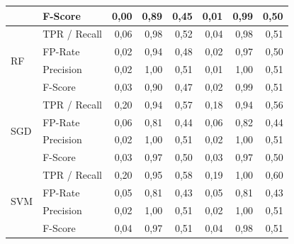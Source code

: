 \begin{table}
{\begin{tabular}{|ll|rrr|rrr|}
                     & F-Score      & 0,00             & 0,89                 & 0,45                     & 0,01             & 0,99                 & 0,50                      \\ 
\hline
\multirow{4}{*}{RF}  & TPR / Recall & 0,06             & 0,98                 & 0,52                     & 0,04             & 0,98                 & 0,51                      \\
                     & FP-Rate      & 0,02             & 0,94                 & 0,48                     & 0,02             & 0,97                 & 0,50                      \\
                     & Precision    & 0,02             & 1,00                 & 0,51                     & 0,01             & 1,00                 & 0,51                      \\
                     & F-Score      & 0,03             & 0,90                 & 0,47                     & 0,02             & 0,99                 & 0,51                      \\ 
\hline
\multirow{4}{*}{SGD} & TPR / Recall & 0,20             & 0,94                 & 0,57                     & 0,18             & 0,94                 & 0,56                      \\
                     & FP-Rate      & 0,06             & 0,81                 & 0,44                     & 0,06             & 0,82                 & 0,44                      \\
                     & Precision    & 0,02             & 1,00                 & 0,51                     & 0,02             & 1,00                 & 0,51                      \\
                     & F-Score      & 0,03             & 0,97                 & 0,50                     & 0,03             & 0,97                 & 0,50                      \\ 
\hline
\multirow{4}{*}{SVM} & TPR / Recall & 0,20             & 0,95                 & 0,58                     & 0,19             & 1,00                 & 0,60                      \\
                     & FP-Rate      & 0,05             & 0,81                 & 0,43                     & 0,05             & 0,81                 & 0,43                      \\
                     & Precision    & 0,02             & 1,00                 & 0,51                     & 0,02             & 1,00                 & 0,51                      \\
                     & F-Score      & 0,04             & 0,97                 & 0,51                     & 0,04             & 0,98                 & 0,51                      \\
\hline
\end{tabular}
}
\end{table}

